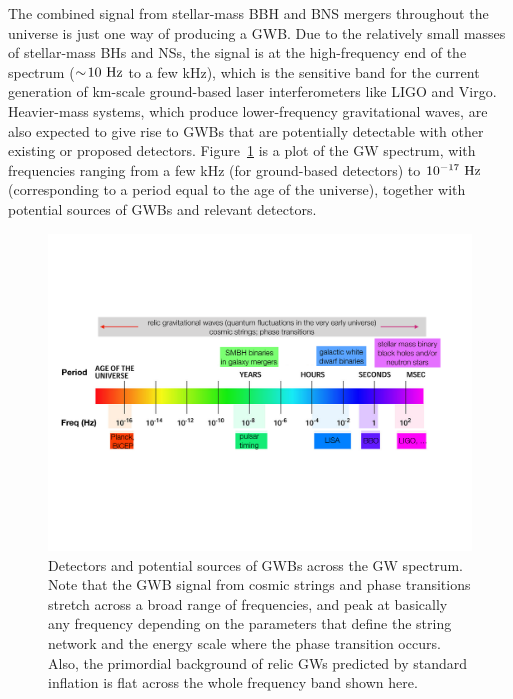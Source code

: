 \documentclass[11pt]{article}
\numberwithin{equation}{section}
\begin{document}
The combined signal from stellar-mass BBH and BNS 
mergers throughout the universe is just one way 
of producing a GWB.
Due to the relatively small masses of stellar-mass 
BHs and NSs, the signal is at the high-frequency 
end of the spectrum ($\sim\!10~{\rm Hz}$ to a few kHz), 
which is the sensitive band for the current generation 
of km-scale ground-based laser interferometers like 
LIGO and Virgo.
Heavier-mass systems, which produce lower-frequency 
gravitational waves, are also expected to give rise 
to GWBs that are potentially detectable with other 
existing or proposed detectors.
Figure~\ref{f:GWspectrum} is a plot of the GW 
spectrum, with frequencies ranging
from a few kHz (for ground-based detectors)
to $10^{-17}~{\rm Hz}$ (corresponding to a period
equal to the age of the universe), together with 
potential sources of GWBs and relevant detectors.  
%
\begin{figure}[htbp!]
\begin{center}
\includegraphics[width=\textwidth]{Figures/GWspectrum}
\caption{Detectors and potential sources of GWBs
across the GW spectrum.
Note that the GWB signal from cosmic strings and phase 
transitions stretch across a broad range of frequencies, 
and peak at basically any frequency depending on 
the parameters that define the string network and the 
energy scale where the phase transition occurs.
Also, the primordial background of relic GWs predicted 
by standard inflation is flat across the whole frequency 
band shown here.}
\label{f:GWspectrum}
\end{center}
\end{figure}
%
\end{document}

